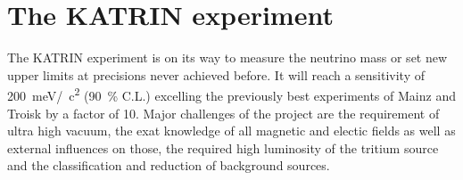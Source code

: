 %

    \chapter{The KATRIN experiment}
    \label{ch:The KATRIN experiment}
    The KATRIN experiment is on its way to measure the neutrino mass or set new upper limits at precisions never achieved before. It will reach a sensitivity of \SI{200}{\milli\electronvolt}/\SI{}{\square c} (\SI{90}{\percent} C.L.) excelling the previously best experiments of Mainz and Troisk by a factor of \SI{10}{}. Major challenges of the project are the requirement of ultra high vacuum, the exat knowledge of all magnetic and electic fields as well as external influences on those, the required high luminosity of the tritium source and the classification and reduction of background sources.
    

